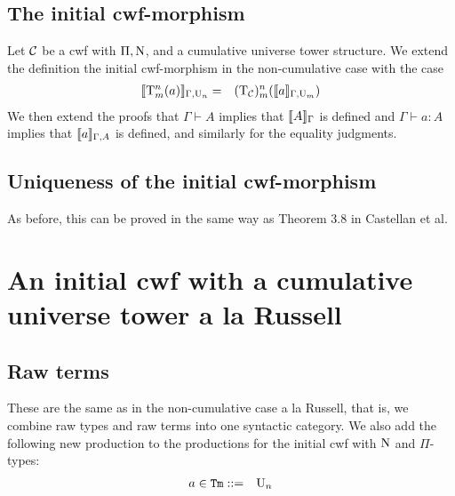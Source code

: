 \documentclass{lmcs}
\newcommand{\Ta}{\mathrm{T}}
\newcommand{\Tan}{\Ta_n}
\newcommand{\Un}{\U_n}
\newcommand{\Nhatn}{\N^n}
\newcommand{\Pihatn}{\Pi^n}
\newcommand{\Nn}{\Nhatn}
\newcommand{\Pin}{\Pihatn}
\newcommand{\UC}{\U_\C}
\newcommand{\NC}{\N_\C}
\newcommand{\PiC}{\Pi_\C}
\begin{document}
\subsection{The initial cwf-morphism} Let ${\mathcal C}$ be a cwf with $\Pi, \mathrm{N}$, and a cumulative universe tower structure. We extend the definition the initial cwf-morphism in the non-cumulative case with the case
\begin{eqnarray*}
\inte{\Ta^n_m(a)}_{\Gamma,\U_n} &= & (\Ta_\C)^n_m(\inte{a}_{\Gamma,\U_m})
\end{eqnarray*}
We then extend the proofs that $\Gamma \vdash A$ implies that $\llbracket A \rrbracket_\Gamma$ is defined and $\Gamma \vdash a : A$ implies that $\llbracket a \rrbracket_{\Gamma,A}$ is defined, and similarly for the equality judgments. 

\subsection{Uniqueness of the initial cwf-morphism} As before, this can be proved in the same way as Theorem 3.8 in Castellan et al.

\section{An initial cwf with a cumulative universe tower a la Russell}

\subsection{Raw terms} These are the same as in the non-cumulative case a la Russell, that is, we combine raw types and raw terms into one syntactic category. We also add the following new production to the productions for the initial cwf with $\mathrm{N}$ and $\Pi$-types:
\begin{eqnarray*}
a \in \RawTm &::=&  \Un
\end{eqnarray*}
\end{document}

